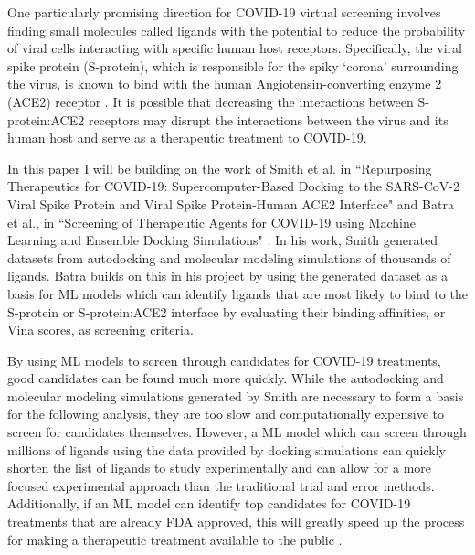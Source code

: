 \documentclass[11pt]{article}
\begin{document}
  One particularly promising direction for COVID-19 virtual screening involves finding small molecules called ligands with the potential to reduce the probability of viral cells interacting with specific human host receptors. Specifically, the viral spike protein (S-protein), which is responsible for the spiky `corona' surrounding the virus, is known to bind with the human Angiotensin-converting enzyme 2 (ACE2) receptor \cite{virtualscreening}. It is possible that decreasing the interactions between S-protein:ACE2 receptors may disrupt the interactions between the virus and its human host and serve as a therapeutic treatment to COVID-19. 
  
  In this paper I will be building on the work of Smith et al. in ``Repurposing Therapeutics for COVID-19: Supercomputer-Based Docking to the SARS-CoV-2 Viral Spike Protein and Viral Spike Protein-Human ACE2 Interface" and Batra et al., in ``Screening of Therapeutic Agents for COVID-19 using Machine Learning and Ensemble Docking Simulations" \cite{batra,smith}. In his work, Smith generated datasets from autodocking and molecular modeling simulations of thousands of ligands. Batra builds on this in his project by using the generated dataset as a basis for ML models which can identify ligands that are most likely to bind to the S-protein or S-protein:ACE2 interface by evaluating their binding affinities, or Vina scores, as screening criteria. 
  
  By using ML models to screen through candidates for COVID-19 treatments, good candidates can be found much more quickly. While the autodocking and molecular modeling simulations generated by Smith are necessary to form a basis for the following analysis, they are too slow and computationally expensive to screen for candidates themselves. However, a ML model which can screen through millions of ligands using the data provided by docking simulations can quickly shorten the list of ligands to study experimentally and can allow for a more focused experimental approach than the traditional trial and error methods. Additionally, if an ML model can identify top candidates for COVID-19 treatments that are already FDA approved, this will greatly speed up the process for making a therapeutic treatment available to the public \cite{batra}.
  
\end{document}
